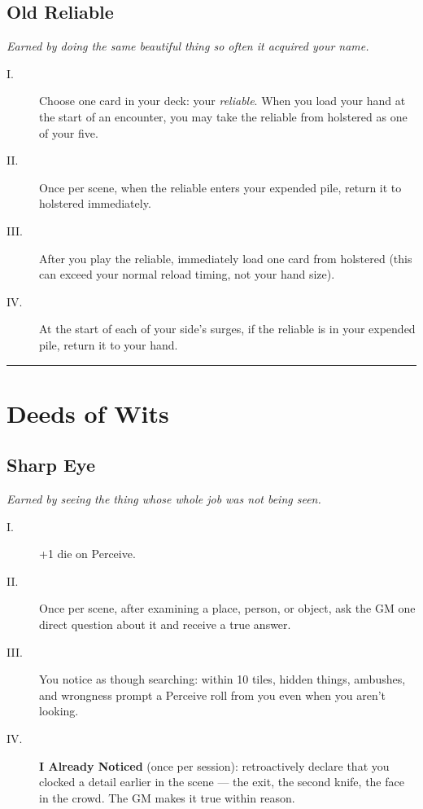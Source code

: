 \subsection{Old Reliable}
\textit{Earned by doing the same beautiful thing so often it acquired your name.}
\begin{description}
    \item[I.] Choose one card in your deck: your \textit{reliable}. When you load your hand at the start of an encounter, you may take the reliable from holstered as one of your five.
    \item[II.] Once per scene, when the reliable enters your expended pile, return it to holstered immediately.
    \item[III.] After you play the reliable, immediately load one card from holstered (this can exceed your normal reload timing, not your hand size).
    \item[IV.] At the start of each of your side's surges, if the reliable is in your expended pile, return it to your hand.
\end{description}

\medskip\hrule\medskip

\section{Deeds of Wits}

\subsection{Sharp Eye}
\textit{Earned by seeing the thing whose whole job was not being seen.}
\begin{description}
    \item[I.] +1 die on Perceive.
    \item[II.] Once per scene, after examining a place, person, or object, ask the GM one direct question about it and receive a true answer.
    \item[III.] You notice as though searching: within 10 tiles, hidden things, ambushes, and wrongness prompt a Perceive roll from you even when you aren't looking.
    \item[IV.] \textbf{I Already Noticed} (once per session): retroactively declare that you clocked a detail earlier in the scene --- the exit, the second knife, the face in the crowd. The GM makes it true within reason.
\end{description}

